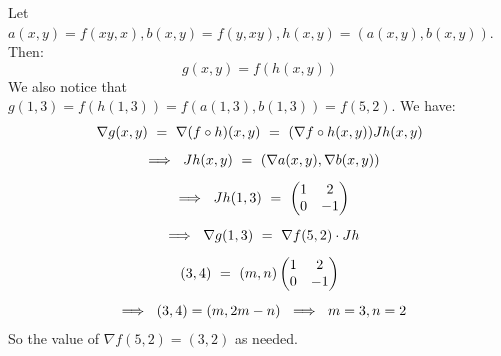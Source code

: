 \begin{soln}
    Let $ a(x,y)=f(xy,x),b(x,y)=f(y,xy),h(x,y)=(a(x,y),b(x,y)) $. Then:
    \begin{equation*}
        g(x,y)=f(h(x,y))
    \end{equation*}
    We also notice that $ g(1,3)=f(h(1,3))=f(a(1,3),b(1,3))=f(5,2) $. We have:
    \begin{gather*}
        \nabla g(x,y) \ = \ \nabla(f\circ h)(x,y) \ = \
        (\nabla f\circ h(x,y))Jh(x,y) \vsp
        \ \implies \ Jh(x,y) \ = \ (\nabla a(x,y), \nabla b(x,y)) \vsp
        \ \implies \ Jh(1,3) \ = \ \begin{pmatrix}
            1 & 2 \\ 0 & -1
        \end{pmatrix} \vsp
        \ \implies \ \nabla g(1,3) \ = \ \nabla f(5,2)\cdot Jh \vsp
        (3,4) \ = \ (m,n)\begin{pmatrix}
            1 & 2 \\ 0 & -1
        \end{pmatrix} \vsp
        \ \implies \ (3,4)=(m,2m-n) \ \implies \ m = 3, n = 2
    \end{gather*}
    So the value of $ \nabla f(5,2) = (3,2) $ as needed.
\end{soln}
